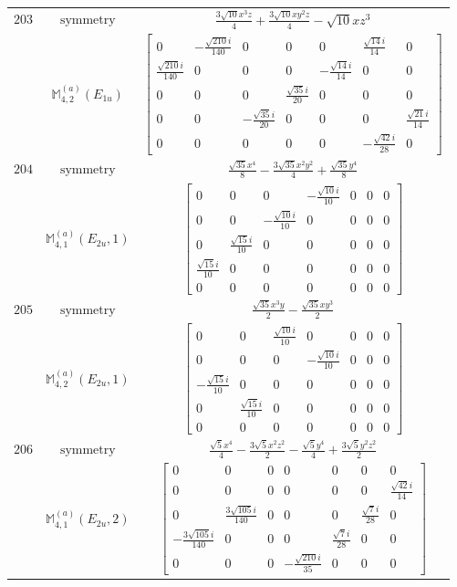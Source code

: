\documentclass[fleqn,8pt,landscape]{jsarticle}
\begin{document}
\begin{longtable}{ccc}
$ 203 $ & $ \text{symmetry} $ & $ \frac{3 \sqrt{10} x^{3} z}{4} + \frac{3 \sqrt{10} x y^{2} z}{4} - \sqrt{10} x z^{3} $ \\
$  $ & $ \mathbb{M}_{4,2}^{(a)}(E_{1u}) $ & $ \begin{bmatrix} 0 & - \frac{\sqrt{210} i}{140} & 0 & 0 & 0 & \frac{\sqrt{14} i}{14} & 0 \\ \frac{\sqrt{210} i}{140} & 0 & 0 & 0 & - \frac{\sqrt{14} i}{14} & 0 & 0 \\ 0 & 0 & 0 & \frac{\sqrt{35} i}{20} & 0 & 0 & 0 \\ 0 & 0 & - \frac{\sqrt{35} i}{20} & 0 & 0 & 0 & \frac{\sqrt{21} i}{14} \\ 0 & 0 & 0 & 0 & 0 & - \frac{\sqrt{42} i}{28} & 0 \end{bmatrix} $ \\ \hline
$ 204 $ & $ \text{symmetry} $ & $ \frac{\sqrt{35} x^{4}}{8} - \frac{3 \sqrt{35} x^{2} y^{2}}{4} + \frac{\sqrt{35} y^{4}}{8} $ \\
$  $ & $ \mathbb{M}_{4,1}^{(a)}(E_{2u},1) $ & $ \begin{bmatrix} 0 & 0 & 0 & - \frac{\sqrt{10} i}{10} & 0 & 0 & 0 \\ 0 & 0 & - \frac{\sqrt{10} i}{10} & 0 & 0 & 0 & 0 \\ 0 & \frac{\sqrt{15} i}{10} & 0 & 0 & 0 & 0 & 0 \\ \frac{\sqrt{15} i}{10} & 0 & 0 & 0 & 0 & 0 & 0 \\ 0 & 0 & 0 & 0 & 0 & 0 & 0 \end{bmatrix} $ \\ \hline
$ 205 $ & $ \text{symmetry} $ & $ \frac{\sqrt{35} x^{3} y}{2} - \frac{\sqrt{35} x y^{3}}{2} $ \\
$  $ & $ \mathbb{M}_{4,2}^{(a)}(E_{2u},1) $ & $ \begin{bmatrix} 0 & 0 & \frac{\sqrt{10} i}{10} & 0 & 0 & 0 & 0 \\ 0 & 0 & 0 & - \frac{\sqrt{10} i}{10} & 0 & 0 & 0 \\ - \frac{\sqrt{15} i}{10} & 0 & 0 & 0 & 0 & 0 & 0 \\ 0 & \frac{\sqrt{15} i}{10} & 0 & 0 & 0 & 0 & 0 \\ 0 & 0 & 0 & 0 & 0 & 0 & 0 \end{bmatrix} $ \\ \hline
$ 206 $ & $ \text{symmetry} $ & $ \frac{\sqrt{5} x^{4}}{4} - \frac{3 \sqrt{5} x^{2} z^{2}}{2} - \frac{\sqrt{5} y^{4}}{4} + \frac{3 \sqrt{5} y^{2} z^{2}}{2} $ \\
$  $ & $ \mathbb{M}_{4,1}^{(a)}(E_{2u},2) $ & $ \begin{bmatrix} 0 & 0 & 0 & 0 & 0 & 0 & 0 \\ 0 & 0 & 0 & 0 & 0 & 0 & \frac{\sqrt{42} i}{14} \\ 0 & \frac{3 \sqrt{105} i}{140} & 0 & 0 & 0 & \frac{\sqrt{7} i}{28} & 0 \\ - \frac{3 \sqrt{105} i}{140} & 0 & 0 & 0 & \frac{\sqrt{7} i}{28} & 0 & 0 \\ 0 & 0 & 0 & - \frac{\sqrt{210} i}{35} & 0 & 0 & 0 \end{bmatrix} $ \\ \hline

\end{longtable}
\end{document}
